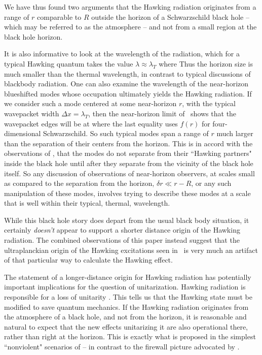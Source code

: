 We have thus found two arguments that the Hawking radiation originates from a range of $r$ comparable to $R$ outside the horizon of a Schwarzschild black hole -- which may be referred to as the atmosphere --  and not from a small region at the black hole horizon.


It is also informative to look at the wavelength of the radiation, which for a typical Hawking quantum takes the value $\lambda\approx \lambda_T$ where
%
\eqn{}
%
Thus the horizon size is much smaller than the thermal wavelength, in contrast to typical discussions of blackbody radiation.  
One can also examine the wavelength of the near-horizon blueshifted modes whose occupation ultimately yields the Hawking radiation.  If we consider such a mode centered at some near-horizon $r$, with the typical wavepacket width $\Delta x=\lambda_T$, then the near-horizon limit of \tortdef\ shows that the wavepacket edges will be at 
%
\eqn{}
%
where the last equality uses $f(r)$ for four-dimensional Schwarzschild.  
So such typical modes span a range of $r$ much larger than the separation of their centers from the horizon.  This is in accord with the observations of \GiddingsBE, that the modes do not separate from their ``Hawking partners" inside the black hole until after they separate from the vicinity of the black hole itself.
So any discussion of observations of near-horizon observers, at scales small as compared to the separation from the horizon, $\delta r\ll r-R$, or any such manipulation of these modes\AMPS, involves trying to describe these modes at a scale that is well within their typical, thermal, wavelength.   

While this black hole story does depart from the usual black body situation, it certainly {\it doesn't} appear to support a shorter distance origin of the Hawking radiation.  The combined observations of this paper instead suggest that the ultraplanckian origin of the Hawking excitations seen in \Hawk\ is very much an artifact of that particular way to calculate the Hawking effect.


The statement of a longer-distance origin for Hawking radiation has potentially important implications for the question of unitarization.  Hawking radiation is responsible for a loss of unitarity .  This tells us that the Hawking state must be modified to save quantum mechanics.  If the Hawking radiation originates from the atmosphere of a black hole, and not from the horizon, it is reasonable and natural to expect that the new effects unitarizing it are also operational there, rather than right at the horizon.  This is exactly what is proposed in the simplest ``nonviolent" scenarios of  -- in contrast to the firewall picture advocated by .  

